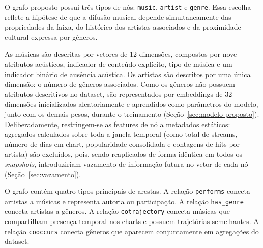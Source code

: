 O grafo proposto possui três tipos de nós: \texttt{music}, \texttt{artist} e \texttt{genre}. Essa escolha reflete a hipótese de que a difusão musical depende simultaneamente das propriedades da faixa, do histórico dos artistas associados e da proximidade cultural expressa por gêneros.


As músicas são descritas por vetores de 12 dimensões, compostos por nove atributos acústicos, indicador de conteúdo explícito, tipo de música e um indicador binário de ausência acústica. Os artistas são descritos por uma única dimensão: o número de gêneros associados. Como os gêneros não possuem atributos descritivos no dataset, são representados por embeddings de 32 dimensões inicializados aleatoriamente e aprendidos como parâmetros do modelo, junto com os demais pesos, durante o treinamento (Seção~\ref{sec:modelo-proposto}). Deliberadamente, restringem-se as features de nó a metadados estáticos: agregados calculados sobre toda a janela temporal (como total de streams, número de dias em chart, popularidade consolidada e contagens de hits por artista) são excluídos, pois, sendo reaplicados de forma idêntica em todos os \emph{snapshots}, introduziriam vazamento de informação futura no vetor de cada nó (Seção~\ref{sec:vazamento}).

O grafo contém quatro tipos principais de arestas. A relação \texttt{performs} conecta artistas a músicas e representa autoria ou participação. A relação \texttt{has\_genre} conecta artistas a gêneros. A relação \texttt{cotrajectory} conecta músicas que compartilham presença temporal nos charts e possuem trajetórias semelhantes. A relação \texttt{cooccurs} conecta gêneros que aparecem conjuntamente em agregações do dataset.


